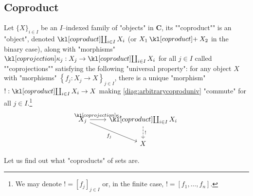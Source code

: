 \documentclass[main.tex]{subfiles}
\begin{document}
\subsection{Coproduct}
\begin{defn}[Coproduct]
    \AP Let $\{X\}_{i \in I}$ be an $I$--indexed family of "objects" in $\mathbf{C}$, its ""coproduct"" is an "object", denoted $\Coproduct_{i \in I} X_i$ (or $X_1 \coproduct X_2$ in the binary case), \AP along with "morphisms" $\coprojection_j: X_j \rightarrow \Coproduct_{i \in I} X_i$ for all $j \in I$ called ""coprojections"" satisfying the following "universal property": for any object $X$ with "morphisms" $\left\{ f_j: X_j \rightarrow X\right\}_{j\in I}$, there is a unique "morphism" $!: \Coproduct_{i \in I}X_i \rightarrow X$ making \eqref{diag:arbitrarycoproduniv} "commute" for all $j \in I$.\footnote{We may denote $! = [f_j]_{j \in I}$ or, in the finite case, $! = [f_1, \dots, f_n]$.}
    \begin{equation}\label{diag:arbitrarycoproduniv}
        \begin{tikzcd}
        X_j  \arrow[r, "\coprojection_j"] \arrow[rd, "f_j"'] &\Coproduct_{i \in I}X_i\arrow[d, "!", dashed]\\
        & X
        \end{tikzcd}
    \end{equation}
\end{defn}
Let us find out what "coproducts" of sets are.
\end{document}
